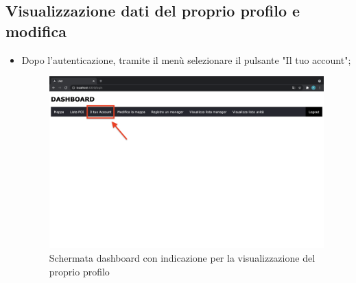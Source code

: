 \subsection{Visualizzazione dati del proprio profilo e modifica}
\begin{itemize}
    \item Dopo l'autenticazione, tramite il menù selezionare il pulsante "Il tuo account";
    \begin{figure}[H]
        \centering
        \includegraphics[scale=0.2]{res/images/dashboard3.png}
        \caption{Schermata dashboard con indicazione per la visualizzazione del proprio profilo}
    \end{figure}
    

\end{itemize}
